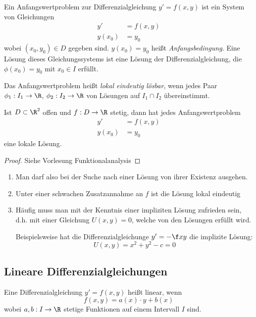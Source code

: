 \documentclass[a4paper,10pt]{scrartcl}
\begin{document}
Ein Anfangswertproblem zur Differenzialgleichung $y'=f(x,y)$ ist ein System von Gleichungen
\begin{align*}
	y' &= f(x,y)\\
y(x_0) &= y_0
\end{align*}
wobei $(x_0,y_0)\in D$ gegeben sind.
$y(x_0) = y_0$ heißt \emph{Anfangsbedingung}.
Eine Lösung dieses Gleichungssystems ist eine Lösung der Differenzialgleichung, die $\phi(x_0)=y_0$ mit $x_0\in I$ erfüllt.

Das Anfangswertproblem heißt \emph{lokal eindeutig lösbar}, wenn jedes Paar $\phi_1 : I_1 \to \R$, $\phi_2 : I_2 \to \R$ von Lösungen auf $I_1\cap I_2$ übereinstimmt.

\begin{thm}[Peano]
	Ist $D\subset \R^2$ offen und $f:D\to \R$ stetig, dann hat jedes Anfangswertproblem
	\begin{align*}
		y' &= f(x,y)\\
	y(x_0) &= y_0
	\end{align*}
	eine lokale Lösung.
	\begin{proof}
		Siehe Vorlesung Funktionalanalysis
	\end{proof}
	\begin{note}
		\begin{enumerate}[1)]
			\item
				Man darf also bei der Suche nach einer Lösung von ihrer Existenz ausgehen.
			\item
				Unter einer schwachen Zusatzannahme an $f$ ist die Lösung lokal eindeutig
			\item
				Häufig muss man mit der Kenntnis einer impliziten Lösung zufrieden sein, d.h. mit einer Gleichung $U(x,y) = 0$, welche von den Lösungen erfüllt wird.

				Beispielsweise hat die Differenzialgleichunge $y'= - \f xy$ die implizite Lösung:
				\[
					U(x,y) = x^2 + y^2 - c = 0
				\]
		\end{enumerate}
	\end{note}
\end{thm}


\subsection{Lineare Differenzialgleichungen}

\begin{df*}
	Eine Differenzialgleichung $y' = f(x,y)$ heißt linear, wenn
	\[
		f(x,y) = a(x)\cdot y + b(x)
	\]
	wobei $a,b: I \to \R$ stetige Funktionen auf einem Intervall $I$ sind.
\end{df*}
\end{document}
